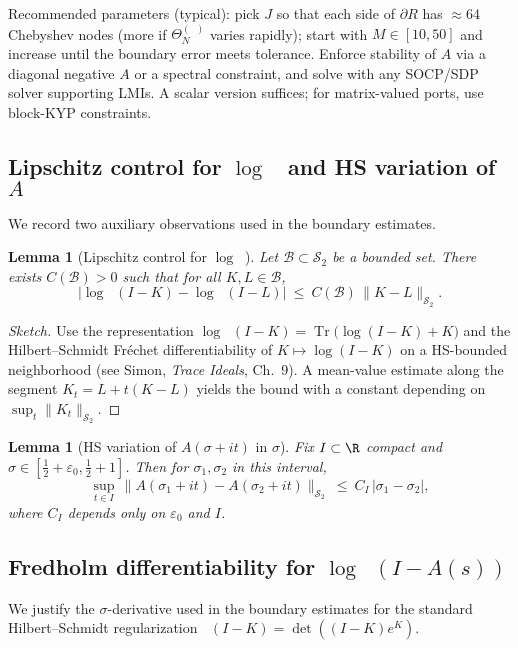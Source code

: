 \documentclass[11pt]{article}
\newtheorem{lemma}[theorem]{Lemma}
\theoremstyle{remark}
\newcommand{\HS}{\mathcal{S}_2}
\DeclareMathOperator{\Tr}{Tr}
\DeclareMathOperator{\dettwo}{det_2}
\begin{document}
Recommended parameters (typical): pick $J$ so that each side of $\partial R$ has $\approx 64$ Chebyshev nodes (more if $\Theta_N^{(\dettwo)}$ varies rapidly); start with $M\in[10,50]$ and increase until the boundary error meets tolerance. Enforce stability of $A$ via a diagonal negative $A$ or a spectral constraint, and solve with any SOCP/SDP solver supporting LMIs. A scalar version suffices; for matrix-valued ports, use block-KYP constraints.
\subsection{Lipschitz control for $\log\dettwo$ and HS variation of $A$}\label{app:lipschitz}
We record two auxiliary observations used in the boundary estimates.

\begin{lemma}[Lipschitz control for $\log\dettwo$]
Let $\mathcal B\subset\HS$ be a bounded set. There exists $C(\mathcal B)>0$ such that for all $K,L\in\mathcal B$,
\[
 \bigl|\log\dettwo(I-K)-\log\dettwo(I-L)\bigr|\ \le\ C(\mathcal B)\,\|K-L\|_{\HS}.
\]
\end{lemma}
\begin{proof}[Sketch]
Use the representation $\log\dettwo(I-K)=\Tr\bigl(\log(I-K)+K\bigr)$ and the Hilbert--Schmidt Fr\'echet differentiability of $K\mapsto \log(I-K)$ on a HS-bounded neighborhood (see Simon, \emph{Trace Ideals}, Ch.~9). A mean-value estimate along the segment $K_t=L+t(K-L)$ yields the bound with a constant depending on $\sup_{t}\|K_t\|_{\HS}$.
\end{proof}

\begin{lemma}[HS variation of $A(\sigma+it)$ in $\sigma$]\label{lem:HS-variation}
Fix $I\subset\R$ compact and $\sigma\in[\tfrac12+\varepsilon_0,\tfrac12+1]$. Then for $\sigma_1,\sigma_2$ in this interval,
\[
 \sup_{t\in I}\,\|A(\sigma_1+it)-A(\sigma_2+it)\|_{\HS}\ \le\ C_I\,|\sigma_1-\sigma_2|,
\]
where $C_I$ depends only on $\varepsilon_0$ and $I$.
\end{lemma}

\subsection{Fredholm differentiability for $\log\dettwo(I-A(s))$}\label{app:fredholm-deriv}
We justify the $\sigma$-derivative used in the boundary estimates for the standard Hilbert--Schmidt regularization $\dettwo(I-K)=\det((I-K)e^{K})$.
\end{document}
